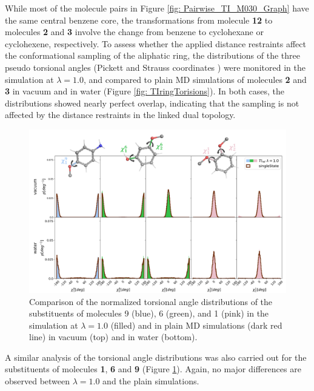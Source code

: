 While most of the molecule pairs in Figure \ref{fig: Pairwise_TI_M030_Graph} have the same central benzene core, the transformations from molecule \textbf{12} to molecules \textbf{2} and \textbf{3} involve the change from benzene to cyclohexane or cyclohexene, respectively. To assess whether the applied distance restraints affect the conformational sampling of the aliphatic ring, the distributions of the three pseudo torsional angles (Pickett and Strauss coordinates \cite{Strauss1970}) were monitored in the simulation at $\lambda=1.0$, and compared to plain MD simulations of molecules \textbf{2} and \textbf{3} in vacuum and in water (Figure \ref{fig: TIringTorisions}).
In both cases, the distributions showed nearly perfect overlap, indicating that the sampling is not affected by the distance restraints in the linked dual topology.
\clearpage
\begin{figure}[h!]
    \centering
    \includegraphics[width=\textwidth]{fig/results/pairwise/sampling/torsions/TI_all_substorsion_ana_partnerM030_singleState_populations_total.png}
    \caption{Comparison of the normalized torsional angle distributions of the substituents of molecules 9 (blue), 6 (green), and 1 (pink) in the simulation at $\lambda=1.0$ (filled) and in plain MD simulations (dark red line) in vacuum (top) and in water (bottom).}
    \label{SIfig: TIsubsTorisions}
\end{figure}

A similar analysis of the torsional angle distributions was also carried out for the substituents of molecules \textbf{1}, \textbf{6} and \textbf{9} (Figure \ref{SIfig: TIsubsTorisions}). Again, no major differences are observed between $\lambda=1.0$ and the plain simulations. 



